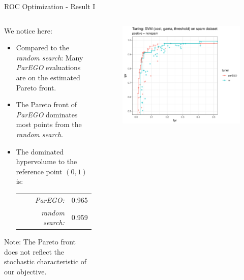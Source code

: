 \begin{frame}{ROC Optimization - Result I}

\begin{columns}
\begin{column}{0.45\textwidth}
  We notice here:
  \begin{itemize}
    \item Compared to the \emph{random search}: Many \emph{ParEGO} evaluations are on the estimated Pareto front.
    \item The Pareto front of \emph{ParEGO} dominates most points from the \emph{random search}.
    \item The dominated hypervolume to the reference point $(0,1)$ is:
    \begin{tabular}{rl}
    \emph{ParEGO:} & 0.965\\
    \emph{random search:} & 0.959\\
    \end{tabular}
  \end{itemize}
  Note: The Pareto front does not reflect the stochastic characteristic of our objective.
\end{column}%
\begin{column}{0.5\textwidth}
  \begin{figure}
  \includegraphics[width=\textwidth]{images/example_parego_spam.png}
  \end{figure}
\end{column}
\end{columns}

\end{frame}

